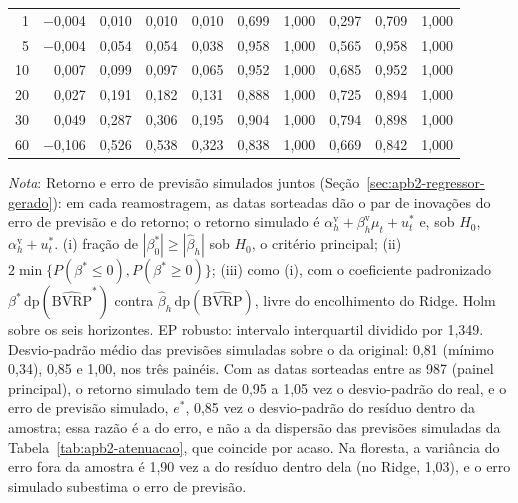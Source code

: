 \begin{table}[H]
\begin{tabular}{rrrrrrrrrr}
1 & $-$0{,}004 & 0{,}010 & 0{,}010 & 0{,}010 & 0{,}699 & 1{,}000 & 0{,}297 & 0{,}709 & 1{,}000 \\
5 & $-$0{,}004 & 0{,}054 & 0{,}054 & 0{,}038 & 0{,}958 & 1{,}000 & 0{,}565 & 0{,}958 & 1{,}000 \\
10 & 0{,}007 & 0{,}099 & 0{,}097 & 0{,}065 & 0{,}952 & 1{,}000 & 0{,}685 & 0{,}952 & 1{,}000 \\
20 & 0{,}027 & 0{,}191 & 0{,}182 & 0{,}131 & 0{,}888 & 1{,}000 & 0{,}725 & 0{,}894 & 1{,}000 \\
30 & 0{,}049 & 0{,}287 & 0{,}306 & 0{,}195 & 0{,}904 & 1{,}000 & 0{,}794 & 0{,}898 & 1{,}000 \\
60 & $-$0{,}106 & 0{,}526 & 0{,}538 & 0{,}323 & 0{,}838 & 1{,}000 & 0{,}669 & 0{,}842 & 1{,}000 \\
\bottomrule
\end{tabular}
\par\smallskip
\parbox{0.95\linewidth}{\footnotesize\textit{Nota}: Retorno e erro de previsão simulados juntos (Seção~\ref{sec:apb2-regressor-gerado}): em cada reamostragem, as datas sorteadas dão o par de inovações do erro de previsão e do retorno; o retorno simulado é $\alpha^{\text{v}}_h + \beta^{\text{v}}_h\mu_t + u^*_t$ e, sob $H_0$, $\alpha^{\text{v}}_h + u^*_t$. (i) fração de $|\beta^*_0| \ge |\hat\beta_h|$ sob $H_0$, o critério principal; (ii) $2\min\{P(\beta^* \le 0), P(\beta^* \ge 0)\}$; (iii) como (i), com o coeficiente padronizado $\beta^*\,\text{dp}(\widehat{\text{BVRP}}^*)$ contra $\hat\beta_h\,\text{dp}(\widehat{\text{BVRP}})$, livre do encolhimento do Ridge. Holm sobre os seis horizontes. EP robusto: intervalo interquartil dividido por 1,349. Desvio-padrão médio das previsões simuladas sobre o da original: 0{,}81 (mínimo 0{,}34), 0{,}85 e 1{,}00, nos três painéis. Com as datas sorteadas entre as 987 (painel principal), o retorno simulado tem de 0{,}95 a 1{,}05 vez o desvio-padrão do real, e o erro de previsão simulado, $e^*$, 0{,}85 vez o desvio-padrão do resíduo dentro da amostra; essa razão é a do erro, e não a da dispersão das previsões simuladas da Tabela~\ref{tab:apb2-atenuacao}, que coincide por acaso. Na floresta, a variância do erro fora da amostra é 1{,}90 vez a do resíduo dentro dela (no Ridge, 1{,}03), e o erro simulado subestima o erro de previsão.}
\end{table}

